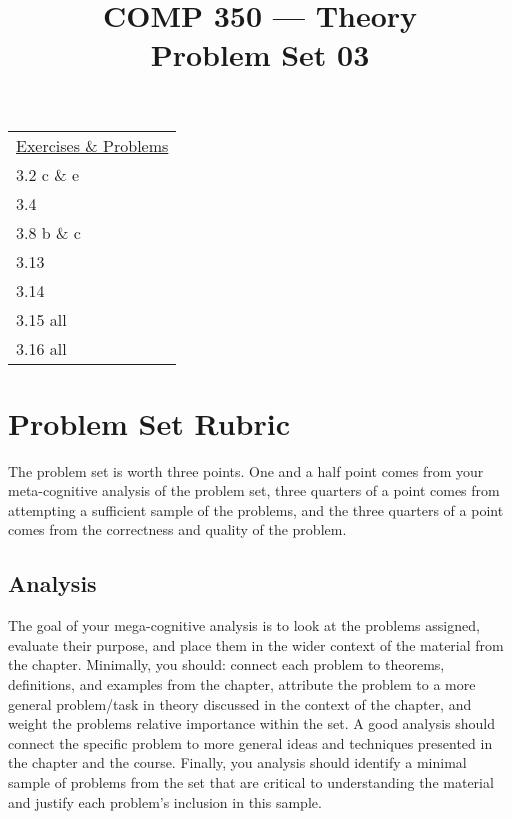 \documentclass[nobib]{tufte-handout}
\title{COMP 350 --- Theory \\ Problem Set 03}
\begin{document}
\maketitle

\begin{center}
\begin{tabular}{l}
  \underline{Exercises \& Problems} \\
  3.2 c \& e \\ %
  3.4 \\ %
  3.8 b \& c \\ %
  3.13 \\  %
  3.14 \\ %
  3.15 all \\ %
  3.16 all \\ %
\end{tabular}
\end{center}


\section*{Problem Set Rubric}

The problem set is worth three points.  One and a half point comes from your meta-cognitive analysis of the problem set, three quarters of a point comes from attempting a sufficient sample of the problems, and the three quarters of a point comes from the correctness and quality of the problem.

\subsection*{Analysis}

The goal of your mega-cognitive analysis is to look at the problems assigned, evaluate their purpose, and place them in the wider context of the material from the chapter. Minimally, you should: connect each problem to theorems, definitions, and examples from the chapter, attribute the problem to a more general problem/task in theory discussed in the context of the chapter, and weight the problems relative importance within the set. A good analysis should connect the specific problem to more general ideas and techniques presented in the chapter and the course. Finally, you analysis should identify a minimal sample of problems from the set that are critical to understanding the material and justify each problem's inclusion in this sample.
\end{document}
